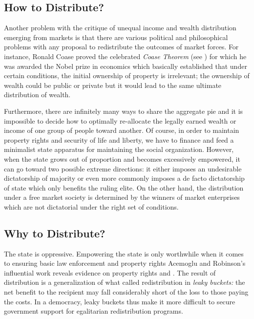 \documentclass[12pt]{article}
\newcommand{\1}{\mathbbm 1}
\begin{document}
	
		\subsection{How to Distribute?}
		
		Another problem with the critique of unequal income and wealth distribution emerging from markets is that there are various political and philosophical problems with any proposal to redistribute the outcomes of market forces. For instance, Ronald Coase proved the celebrated \textit{Coase Theorem} (see \cite{coase1981coase}) for which he was awarded the Nobel prize in economics which basically established that under certain conditions, the initial ownership of property is irrelevant; the ownership of wealth could be public or private but it would lead to the same ultimate distribution of wealth.
		
		Furthermore, there are infinitely many ways to share the aggregate pie and it is impossible to decide how to optimally re-allocate the legally earned wealth or income of one group of people toward another. Of course, in order to maintain property rights and security of life and liberty, we have to finance and feed a minimalist state apparatus for maintaining the social organization. However, when the state grows out of proportion and becomes excessively empowered, it can go toward two possible extreme directions: it either imposes an undesirable dictatorship of majority or even more commonly imposes a de facto dictatorship of state which only benefits the ruling elite. On the other hand, the distribution under a free market society is determined by the winners of market enterprises which are not dictatorial under the right set of conditions.
		
		
		
		\subsection{Why to Distribute?}
		
		
		
		
		
		The state is oppressive. Empowering the state is only worthwhile when it comes to ensuring basic law enforcement and property rights Acemoglu and Robinson's influential work reveals evidence on property rights \cite{robinson2012nations} and \cite{friedman1989machinery}.
		 The result of distribution is a generalization of what \cite{okun1975big}
		called redistribution in \textit{leaky buckets:} the net benefit to the
		recipient may fall considerably short of the loss to those
		paying the costs. In a democracy, leaky buckets thus make it more difficult to secure government support for egalitarian redistribution programs.
		
\end{document}
